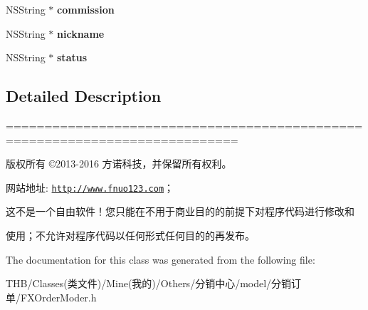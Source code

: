\begin{DoxyCompactItemize}
\item 
\mbox{\label{interface_f_x_order_moder_a21e8f443ff4edad7affbc2f691b227f7}} 
N\+S\+String $\ast$ {\bfseries commission}
\item 
\mbox{\label{interface_f_x_order_moder_a4564fb36da81a23141d0445219c79cbd}} 
N\+S\+String $\ast$ {\bfseries nickname}
\item 
\mbox{\label{interface_f_x_order_moder_ad1fb32bf4ccc6785970b9cbcafe00562}} 
N\+S\+String $\ast$ {\bfseries status}
\end{DoxyCompactItemize}


\subsection{Detailed Description}
============================================================================

版权所有 ©2013-\/2016 方诺科技，并保留所有权利。

网站地址\+: \href{http://www.fnuo123.com}{\tt http\+://www.\+fnuo123.\+com}； 



这不是一个自由软件！您只能在不用于商业目的的前提下对程序代码进行修改和

使用；不允许对程序代码以任何形式任何目的的再发布。 

 

The documentation for this class was generated from the following file\+:\begin{DoxyCompactItemize}
\item 
T\+H\+B/\+Classes(类文件)/\+Mine(我的)/\+Others/分销中心/model/分销订单/F\+X\+Order\+Moder.\+h\end{DoxyCompactItemize}
